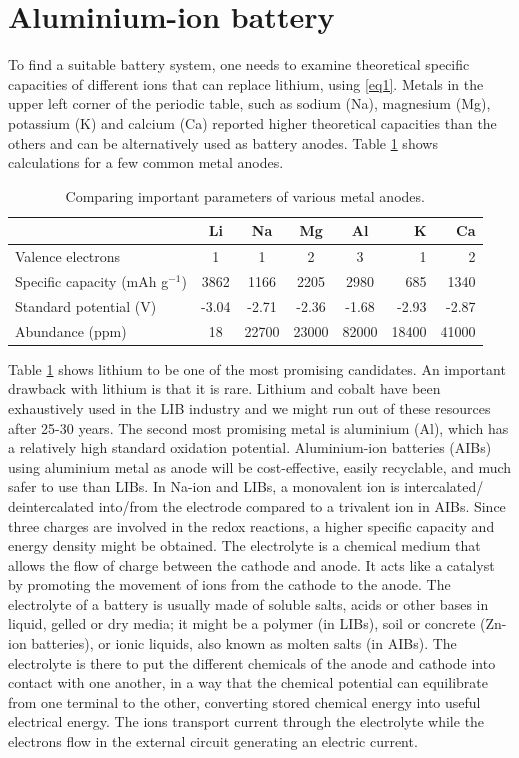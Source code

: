 \section{Aluminium-ion battery}
To find a suitable battery system, one needs to examine theoretical specific capacities of different ions that can replace lithium, using \ref{eq1}. Metals in the upper left corner of the periodic table, such as sodium (Na), magnesium (Mg), potassium (K) and calcium (Ca) reported higher theoretical capacities than the others and can be alternatively used as battery anodes. Table  \ref{table1} shows calculations for a few common metal anodes. 
\begin{table}[tbh!]
\caption{Comparing important parameters of various metal anodes.} \label{table1}
\begin{tabular}{lccccrr}
\headrow
\hline
 & \textbf{Li} & \textbf{Na} & \textbf{Mg} & \textbf{Al} & \textbf{K} & \textbf{Ca}\\
\hline
Valence electrons & 1 & 1 & 2 & 3 & 1 & 2\\
Specific capacity (mAh g$^{-1}$) & 3862 & 1166 & 2205 & 2980 & 685 & 1340\\
Standard potential (V) & -3.04 & -2.71 & -2.36  & -1.68 & -2.93 & -2.87\\
Abundance (ppm) & 18 & 22700 & 23000 & 82000 & 18400 & 41000\\
\hline  %
\end{tabular}
\end{table}

Table \ref{table1} shows lithium to be one of the most promising candidates. An important drawback with lithium is that it is rare. Lithium and cobalt have been exhaustively used in the LIB industry and we might run out of these resources after 25-30 years. The second most promising metal is aluminium (Al), which has a relatively high standard oxidation potential. Aluminium-ion batteries (AIBs) using aluminium metal as anode will be cost-effective, easily recyclable, and much safer to use than LIBs.  In Na-ion and LIBs, a monovalent ion is intercalated/ deintercalated into/from the electrode compared to a trivalent ion in AIBs. Since three charges are involved in the redox reactions, a higher specific capacity and energy density might be obtained. The electrolyte is a chemical medium that allows the flow of charge between the cathode and anode. It acts like a catalyst by promoting the movement of ions from the cathode to the anode. The electrolyte of a battery is usually made of soluble salts, acids or other bases in liquid, gelled or dry media; it might be a polymer (in LIBs), soil or concrete (Zn-ion batteries), or ionic liquids, also known as molten salts (in AIBs). The electrolyte is there to put the different chemicals of the anode and cathode into contact with one another, in a way that the chemical potential can equilibrate from one terminal to the other, converting stored chemical energy into useful electrical energy. The ions transport current through the electrolyte while the electrons flow in the external circuit generating an electric current. 

